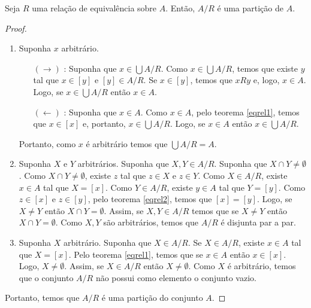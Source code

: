 \begin{Theorem}
Seja $R$ uma relação de equivalência sobre $A$. Então, $A / R$ é uma
partição de $A$.
\end{Theorem}
\begin{proof}
\begin{enumerate}
  Para demonstrar que $A / R$ devemos provar as 3 partes da definição
  de partição (definição \ref{partdef}).
  \item Suponha $x$ arbitrário.
    \begin{enumerate}
         \item[$(\to)$] : Suponha que $x \in \bigcup A /
    R$. Como $x\in \bigcup A / R$, temos que existe $y$ tal que $x \in
    [y]$ e $[y] \in A /R$. Se $x \in [y]$, temos que $xRy$ e, logo, $x
    \in A$. Logo, se $x\in \bigcup A / R$ então $x \in A$.
         \item[$(\leftarrow)$]: Suponha que $x \in A$. Como $x \in A$,
           pelo teorema \ref{eqrel1}, temos que $x \in [x]$ e,
           portanto, $x \in \bigcup A / R$. Logo, se $x \in A$ então
           $x \in \bigcup A / R$.
    \end{enumerate}
    Portanto, como $x$ é arbitrário temos que $\bigcup A / R = A$.
  \item Suponha $X$ e $Y$ arbitrários. Suponha que $X,Y \in A / R$. Suponha que $X \cap Y \neq
    \emptyset$. Como $X \cap Y \neq \emptyset$, existe $z$ tal que $z
    \in X$ e $z \in Y$. Como $X \in A / R$, existe $x \in A$ tal que
    $X = [x]$. Como $Y \in A / R$, existe $y \in A$ tal que $Y =
    [y]$. Como $z \in [x]$ e $z \in [y]$, pelo teorema \ref{eqrel2},
    temos que $[x] = [y]$. Logo, se $X \neq Y$ então $X \cap Y =
    \emptyset$. Assim, se $X ,Y\in A / R$ temos que se $X \neq Y$ então $X \cap Y =
    \emptyset$. Como $X,Y$ são arbitrários, temos que $A / R$ é
    disjunta par a par.
  \item Suponha $X$ arbitrário. Suponha que $X \in A /R$. Se $X \in A
    / R$, existe $x \in A$ tal que $X = [x]$. Pelo teorema
    \ref{eqrel1}, temos que se $x \in A$ então $x \in [x]$. Logo, $X
    \neq \emptyset$. Assim, se $X \in A / R$ então $X \neq \emptyset$.
    Como $X$ é arbitrário, temos que o conjunto $A / R$ não possui
    como elemento o conjunto vazio.
\end{enumerate}
Portanto, temos que $A / R$ é uma partição do conjunto $A$.
\end{proof}

